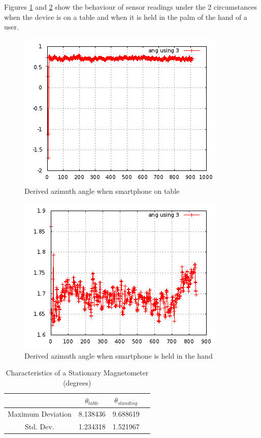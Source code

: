 Figures \ref{fig:angle_stationary_table} and \ref{fig:angle_handheld_standing}
show the behaviour of sensor readings under the 2 circumstances when the 
device is on a table and when it is held in the palm of the hand of a user.

\begin{figure}\centering
    \includegraphics{figures/angle_stationary_table.png}
    \caption{Derived azimuth angle when smartphone on table\label{fig:angle_stationary_table}}
\end{figure}

\begin{figure}\centering
    \includegraphics{figures/angle_handheld_standing.png}
    \caption{Derived azimuth angle when smartphone is held in the hand\label{fig:angle_handheld_standing}}
\end{figure}


\begin{table}
\centering
\begin{tabular}{c c c c}
\hline
\hline
 & $\theta_{table}$ & $\theta_{standing}$ \\
\hline
Maximum Deviation & 8.138436 & 9.688619 \\
Std. Dev. & 1.234318 & 1.521967 \\
\hline
\end{tabular}
\caption{Characteristics of a Stationary Magnetometer (degrees)\label{tbl:angle_chars}}
\end{table}


